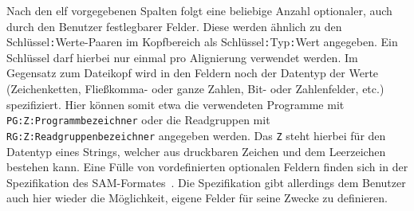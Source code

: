 Nach den elf vorgegebenen Spalten folgt eine beliebige Anzahl optionaler, auch durch den Benutzer festlegbarer Felder.
Diese werden ähnlich zu den Schlüssel\texttt{:}Werte-Paaren im Kopfbereich als Schlüssel\texttt{:}Typ\texttt{:}Wert angegeben.
Ein Schlüssel darf hierbei nur einmal pro Alignierung verwendet werden.
Im Gegensatz zum Dateikopf wird in den Feldern noch der Datentyp der Werte (Zeichenketten, Fließkomma- oder ganze Zahlen, Bit- oder Zahlenfelder, etc.) spezifiziert.
Hier können somit etwa die verwendeten Programme mit \texttt{PG:Z:Programmbezeichner} oder die Readgruppen mit \texttt{RG:Z:Readgruppenbezeichner} angegeben werden.
Das \texttt{Z} steht hierbei für den Datentyp eines Strings, welcher aus druckbaren Zeichen und dem Leerzeichen bestehen kann.
Eine Fülle von vordefinierten optionalen Feldern finden sich in der Spezifikation des SAM-Formates~\citep{samspec}.
Die Spezifikation gibt allerdings dem Benutzer auch hier wieder die Möglichkeit, eigene Felder für seine Zwecke zu definieren.

